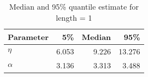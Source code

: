 \begin{table}[ht]
\centering
\begin{tabular}{lrrr}
  \hline
Parameter & 5\% & Median & 95\% \\ 
  \hline
$\eta$ & 6.053 & 9.226 & 13.276 \\ 
  $\alpha$ & 3.136 & 3.313 & 3.488 \\ 
   \hline
\end{tabular}
\caption{Median and 95\% quantile estimate for length = 1} 
\end{table}
